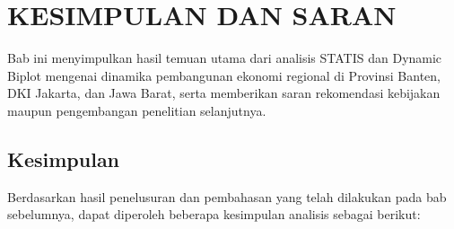 \chapter{\normalsize KESIMPULAN DAN SARAN}
\raggedbottom

Bab ini menyimpulkan hasil temuan utama dari analisis STATIS dan Dynamic Biplot mengenai dinamika pembangunan ekonomi regional di Provinsi Banten, DKI Jakarta, dan Jawa Barat, serta memberikan saran rekomendasi kebijakan maupun pengembangan penelitian selanjutnya.

\section{\normalsize Kesimpulan}
Berdasarkan hasil penelusuran dan pembahasan yang telah dilakukan pada bab sebelumnya, dapat diperoleh beberapa kesimpulan analisis sebagai berikut:


